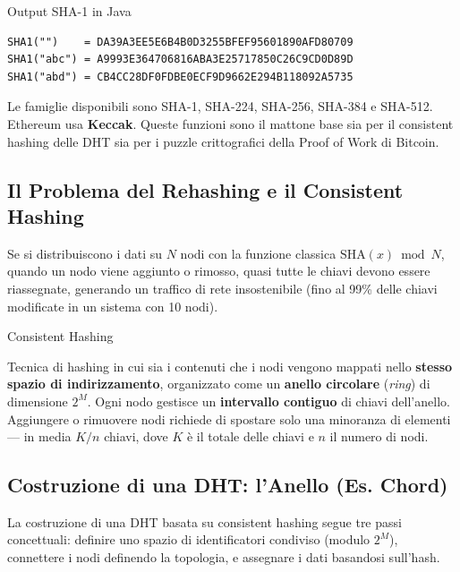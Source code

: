 \documentclass[
  italian,
  openany]{book}
\begin{document}
\begin{callouttip}{Output SHA-1 in Java}

\begin{verbatim}
SHA1("")    = DA39A3EE5E6B4B0D3255BFEF95601890AFD80709
SHA1("abc") = A9993E364706816ABA3E25717850C26C9CD0D89D
SHA1("abd") = CB4CC28DF0FDBE0ECF9D9662E294B118092A5735
\end{verbatim}

\end{callouttip}

Le famiglie disponibili sono SHA-1, SHA-224, SHA-256, SHA-384 e SHA-512.
Ethereum usa \textbf{Keccak}. Queste funzioni sono il mattone base sia
per il consistent hashing delle DHT sia per i puzzle crittografici della
Proof of Work di Bitcoin.

\subsection{Il Problema del Rehashing e il Consistent
Hashing}\label{il-problema-del-rehashing-e-il-consistent-hashing}

Se si distribuiscono i dati su \(N\) nodi con la funzione classica
\(\text{SHA}(x) \bmod N\), quando un nodo viene aggiunto o rimosso,
quasi tutte le chiavi devono essere riassegnate, generando un traffico
di rete insostenibile (fino al 99\% delle chiavi modificate in un
sistema con 10 nodi).

\begin{calloutdefinition}{Consistent Hashing}

Tecnica di hashing in cui sia i contenuti che i nodi vengono mappati
nello \textbf{stesso spazio di indirizzamento}, organizzato come un
\textbf{anello circolare} (\emph{ring}) di dimensione \(2^M\). Ogni nodo
gestisce un \textbf{intervallo contiguo} di chiavi dell'anello.
Aggiungere o rimuovere nodi richiede di spostare solo una minoranza di
elementi --- in media \(K/n\) chiavi, dove \(K\) è il totale delle
chiavi e \(n\) il numero di nodi.

\end{calloutdefinition}

\subsection{Costruzione di una DHT: l'Anello (Es.
Chord)}\label{costruzione-di-una-dht-lanello-es.-chord}

La costruzione di una DHT basata su consistent hashing segue tre passi
concettuali: definire uno spazio di identificatori condiviso (modulo
\(2^M\)), connettere i nodi definendo la topologia, e assegnare i dati
basandosi sull'hash.
\end{document}
